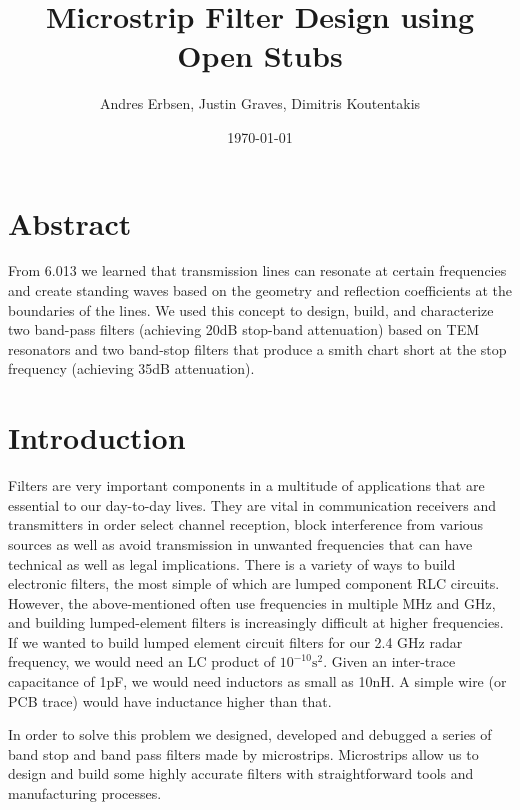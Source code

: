 \documentclass[letterpaper, 11pt, twocolumn]{article}
\begin{document}
\title{\vspace{-15mm} Microstrip Filter Design using Open Stubs}
\author{Andres Erbsen, Justin Graves, Dimitris Koutentakis}
\date{\today}
\maketitle
\section{Abstract}
From 6.013 we learned that transmission lines can resonate at certain
frequencies and create standing waves based on the geometry and reflection
coefficients at the boundaries of the lines. We used this concept to design,
build, and characterize two band-pass filters (achieving 20dB stop-band
attenuation) based on TEM resonators and two band-stop filters that produce a
smith chart short at the stop frequency (achieving 35dB attenuation).

\section {Introduction}
Filters are very important components in a multitude of applications that are
essential to our day-to-day lives. They are vital in communication receivers and
transmitters in order select channel reception, block interference from various
sources as well as avoid transmission in unwanted frequencies that can have
technical as well as legal implications.  There is a variety of ways to build
electronic filters, the most simple of which are lumped component RLC 
circuits. However, the above-mentioned often use frequencies in multiple MHz and
GHz, and building lumped-element filters is increasingly difficult at higher
frequencies.  If we wanted to build lumped
element circuit filters for our 2.4 GHz radar
frequency, we would need an LC product of $10^{-10}\text{s}^2$. Given an
inter-trace capacitance of 1pF, we would need inductors as small as 10nH.
A simple wire (or PCB trace) would have inductance higher than that.

In order to solve this problem we designed, developed and debugged a series of
band stop and band pass filters made by microstrips. Microstrips allow us to
design and build some highly accurate filters with straightforward tools and
manufacturing processes.
\end{document}
